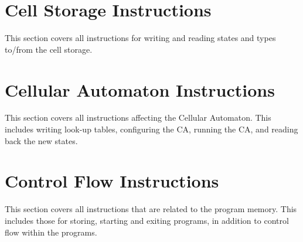 \documentclass[a4paper,twoside,12pt]{article}
\begin{document}





\cleardoublepage
\section{Cell Storage Instructions}

This section covers all instructions for writing and reading states and types to/from the cell storage.













\cleardoublepage
\section{Cellular Automaton Instructions}

This section covers all instructions affecting the Cellular Automaton.
This includes writing look-up tables, configuring the CA, running the CA, and reading back the new states.








\cleardoublepage
\section{Control Flow Instructions}

This section covers all instructions that are related to the program memory.
This includes those for storing, starting and exiting programs, in addition to control flow within the programs.










\end{document}
